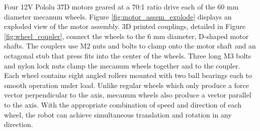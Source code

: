 Four 12V Pololu 37D motors geared at a 70:1 ratio drive each of the 60 mm diameter mecanum wheels. Figure \ref{fig:motor_assem_explode} displays an exploded view of the motor assembly. 3D printed couplings, detailed in Figure \ref{fig:wheel_coupler}, connect the wheels to the 6 mm diameter, D-shaped motor shafts. The couplers use M2 nuts and bolts to clamp onto the motor shaft and an octagonal stub that press fits into the center of the wheels. Three long M3 bolts and nylon lock nuts clamp the mecanum wheels together and to the coupler. Each wheel contains eight angled rollers mounted with two ball bearings each to smooth operation under load. Unlike regular wheels which only produce a force vector perpendicular to the axis, mecanum wheels also produce a vector parallel to the axis. With the appropriate combination of speed and direction of each wheel, the robot can achieve simultaneous translation and rotation in any direction. 

